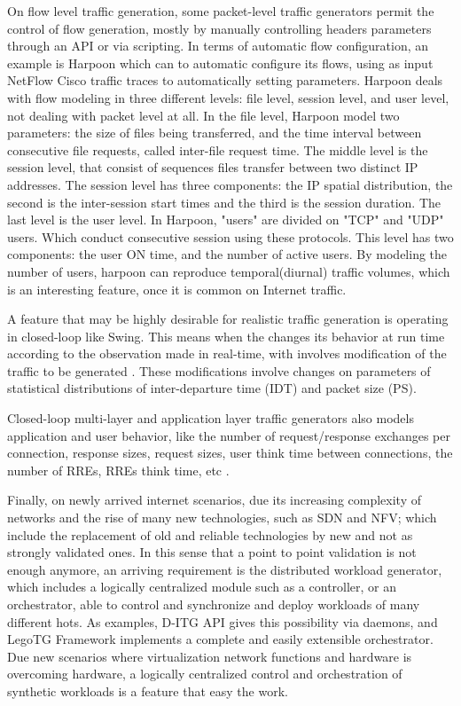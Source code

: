On flow level traffic generation, some packet-level traffic generators permit the control of flow generation, mostly by manually controlling headers parameters through an API or via scripting. In terms of automatic flow configuration, an example is Harpoon\cite{harpoon-paper} which can to automatic configure its flows, using as input NetFlow Cisco traffic traces to automatically setting parameters. Harpoon deals with flow modeling in three different levels: file level, session level, and user level, not dealing with packet level at all.  In the file level, Harpoon model two parameters:  the size of files being transferred, and the time interval between consecutive file requests, called inter-file request time. The middle level is the session level, that consist of sequences files transfer between two distinct IP addresses. The session level has three components: the IP spatial distribution, the second is the inter-session start times and the third is the session duration. The last level is the user level. In Harpoon, "users" are divided on "TCP" and "UDP" users. Which conduct consecutive session using these protocols. This level has two components: the user ON time, and the number of active users. By modeling the number of users, harpoon can reproduce temporal(diurnal) traffic volumes, which is an interesting feature, once it is common on Internet traffic. 

A feature that may be highly desirable for realistic traffic generation is  operating in closed-loop like Swing\cite{swing-paper}. This means when the changes its behavior at run time according to the observation made in real-time, with involves modification of the traffic to be generated \cite{ditg-paper}. These modifications involve changes on parameters of statistical distributions of inter-departure time (IDT) and packet size (PS).

Closed-loop multi-layer and application layer traffic generators also models application and user behavior, like the number of request/response exchanges per connection, response sizes, request sizes, user think time between connections, the number of RREs, RREs think time, etc \cite{swing-paper}.

Finally, on newly arrived internet scenarios, due its increasing complexity of networks and the rise of many new technologies, such as SDN\cite{sdn-survey} and NFV\cite{nfv-challenges}; which include the replacement of old and reliable technologies by new and not as strongly validated ones. In this sense that a point to point validation is not enough anymore, an arriving requirement is the distributed workload generator, which includes a logically centralized module such as a controller\cite{ditg-paper}, or an orchestrator\cite{legotg-paper}, able to control and synchronize and deploy workloads of many different hots. As examples, D-ITG API gives this possibility via daemons, and LegoTG\cite{legotg-paper} Framework implements a complete and easily extensible orchestrator. Due new scenarios where virtualization network functions and hardware is overcoming hardware, a logically centralized control and orchestration of synthetic workloads is a feature that easy the work\cite{legotg-paper}.


